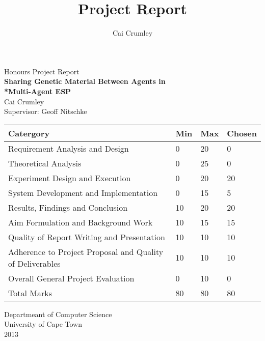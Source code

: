 \documentclass[12pt]{article} %
\title{Project Report}
\author{Cai Crumley}
\begin{document}
\begin{titlepage}
\begin{center}

{\LARGE Honours Project Report} \\[5cm]

{\Huge \bfseries Sharing Genetic Material Between Agents in \\*Multi-Agent ESP} \\[1.5cm]

{\Large Cai Crumley} \\[0.5cm]

{\Large Supervisor: Geoff Nitschke}\\[0.5cm]

{\small \centering
    \begin{tabular}{|l|l|l|l|}
    \hline
    Catergory                                                 & Min & Max & Chosen \\ \hline
    Requirement Analysis and Design                           & 0   & 20  & 0      \\ \hline
    Theoretical Analysis                                      & 0   & 25  & 0      \\ \hline
    Experiment Design and Execution                           & 0   & 20  & 20     \\ \hline
    System Development and Implementation                     & 0   & 15  & 5      \\ \hline
    Results, Findings and Conclusion                          & 10  & 20  & 20     \\ \hline
    Aim Formulation and Background Work                       & 10  & 15  & 15     \\ \hline
    Quality of Report Writing and Presentation                & 10  & 10  & 10     \\ \hline
    Adherence to Project Proposal and Quality of Deliverables & 10  & 10 & 10     \\ \hline
    Overall General Project Evaluation                        & 0   & 10  & 0      \\ \hline
    Total Marks                                               & 80  & 80 & 80     \\ \hline
    \end{tabular}
}

\vfill

{\large Departmeant of Computer Science}\\[0.25cm]
{\large University of Cape Town}\\[0.25cm]
{\large 2013}

\end{center}
\end{titlepage}
\end{document}
